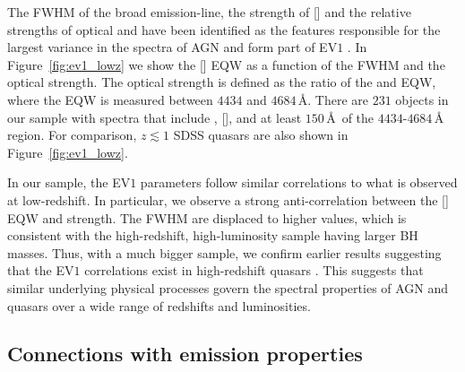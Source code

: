 The FWHM of the broad \hb emission-line, the strength of [] and the relative strengths of optical  and \hb have been identified as the features responsible for the largest variance in the spectra of AGN and form part of EV$1$ \citep{boroson92}.   
In Figure~\ref{fig:ev1_lowz} we show the [] EQW as a function of the \hb FWHM and the optical  strength. 
The optical  strength is defined as the ratio of the  and \hb EQW, where the  EQW is measured between $4434$ and $4684$\,\AA.
There are $231$ objects in our sample with spectra that include \hbns, [], and at least $150$\,\AA\, of the $4434$-$4684$\,\AA\,  region.  
For comparison, $z\lesssim1$ SDSS quasars are also shown in Figure~\ref{fig:ev1_lowz}. 
 
In our sample, the EV$1$ parameters follow similar correlations to what is observed at low-redshift.
In particular, we observe a strong anti-correlation between the [] EQW and  strength.  
The \hb FWHM are displaced to higher values, which is consistent with the high-redshift, high-luminosity sample having larger BH masses. 
Thus, with a much bigger sample, we confirm earlier results suggesting that the EV$1$ correlations exist in high-redshift quasars \citep[e.g.][]{netzer04,sulentic04,sulentic06,runnoe13,shen16a}.
This suggests that similar underlying physical processes govern the spectral properties of AGN and quasars over a wide range of redshifts and luminosities. 

\subsection{Connections with  emission properties}
\label{sec:ch4-civtrends}

